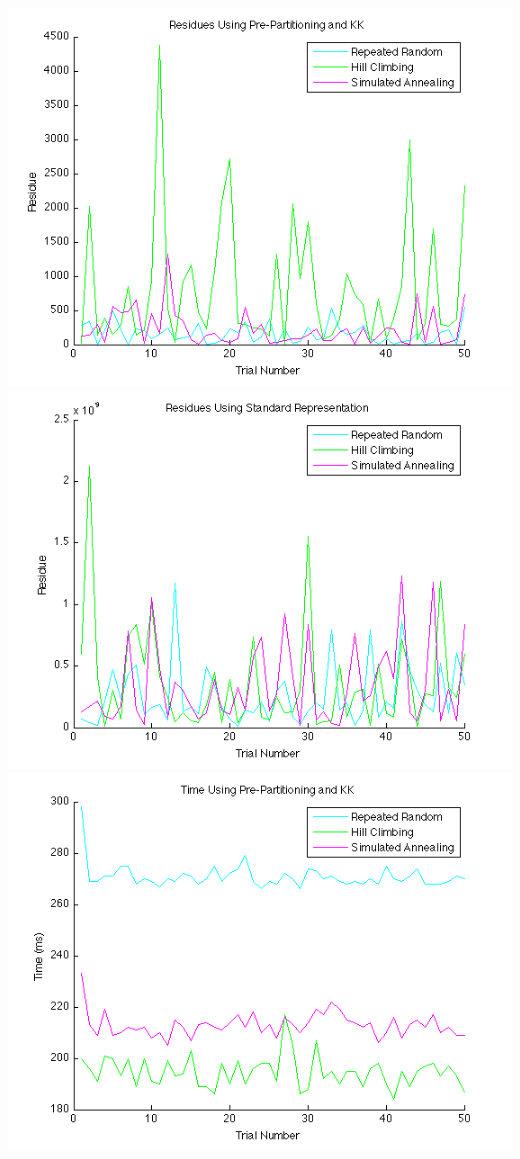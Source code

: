 \documentclass[solution, letterpaper]{cs124}
\begin{document}
\includegraphics[scale=0.50]{fig-res-pre.png}
\includegraphics[scale=0.50]{fig-res-stand.png}\\
\includegraphics[scale=0.50]{fig-time-pre.png}
\end{document}
